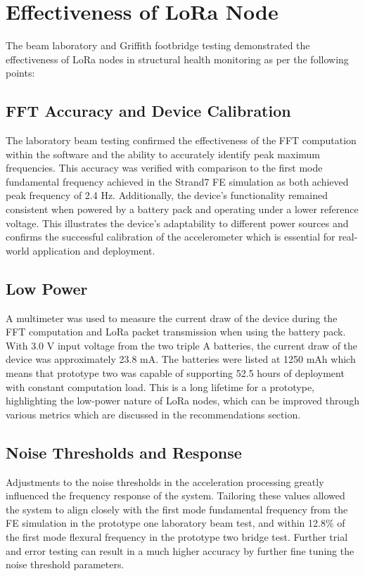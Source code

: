 \section{Effectiveness of LoRa Node}
The beam laboratory and Griffith footbridge testing demonstrated the effectiveness of LoRa nodes in structural health monitoring as per the following points:
\subsection{FFT Accuracy and Device Calibration} 
The laboratory beam testing confirmed the effectiveness of the FFT computation within the software and the ability to accurately identify peak maximum frequencies. This accuracy was verified with comparison to the first mode fundamental frequency achieved in the Strand7 FE simulation as both achieved peak frequency of 2.4 Hz. Additionally, the device's functionality remained consistent when powered by a battery pack and operating under a lower reference voltage. This illustrates the device's adaptability to different power sources and confirms the successful calibration of the accelerometer which is essential for real-world application and deployment.
\subsection{Low Power}
A multimeter was used to measure the current draw of the device during the FFT computation and LoRa packet transmission when using the battery pack. With 3.0 V input voltage from the two triple A batteries, the current draw of the device was approximately 23.8 mA. The batteries were listed at 1250 mAh which means that prototype two was capable of supporting 52.5 hours of deployment with constant computation load. This is a long lifetime for a prototype, highlighting the low-power nature of LoRa nodes, which can be improved through various metrics which are discussed in the recommendations section. 
\subsection{Noise Thresholds and Response}
Adjustments to the noise thresholds in the acceleration processing greatly influenced the frequency response of the system. Tailoring these values allowed the system to align closely with the first mode fundamental frequency from the FE simulation in the prototype one laboratory beam test, and within 12.8\% of the first mode flexural frequency in the prototype two bridge test. Further trial and error testing can result in a much higher accuracy by further fine tuning the noise threshold parameters. 
